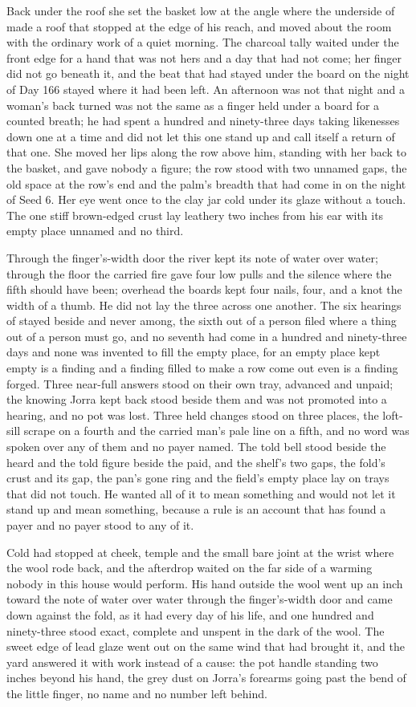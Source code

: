 Back under the roof she set the basket low at the angle where the underside of  made a roof that stopped at the edge of his reach, and moved about the room with the ordinary work of a quiet morning. The charcoal tally waited under the front edge for a hand that was not hers and a day that had not come; her finger did not go beneath it, and the beat that had stayed under the board on the night of Day 166 stayed where it had been left. An afternoon was not that night and a woman's back turned was not the same as a finger held under a board for a counted breath; he had spent a hundred and ninety-three days taking likenesses down one at a time and did not let this one stand up and call itself a return of that one. She moved her lips along the row above him, standing with her back to the basket, and gave nobody a figure; the row stood with two unnamed gaps, the old space at the row's end and the palm's breadth that had come in on the night of Seed 6. Her eye went once to the clay jar cold under its glaze without a touch. The one stiff brown-edged crust lay leathery two inches from his ear with its empty place unnamed and no third.

Through the finger's-width door the river kept its note of water over water; through the floor the carried fire gave four low pulls and the silence where the fifth should have been; overhead the boards kept four nails, four, and a knot the width of a thumb. He did not lay the three across one another. The six hearings of  stayed beside and never among, the sixth out of a person filed where a thing out of a person must go, and no seventh had come in a hundred and ninety-three days and none was invented to fill the empty place, for an empty place kept empty is a finding and a finding filled to make a row come out even is a finding forged. Three near-full answers stood on their own tray, advanced and unpaid; the knowing Jorra kept back stood beside them and was not promoted into a hearing, and no pot was lost. Three held changes stood on three places, the loft-sill scrape on a fourth and the carried man's pale line on a fifth, and no word was spoken over any of them and no payer named. The told bell stood beside the heard and the told figure beside the paid, and the shelf's two gaps, the fold's crust and its gap, the pan's gone ring and the field's empty place lay on trays that did not touch. He wanted all of it to mean something and would not let it stand up and mean something, because a rule is an account that has found a payer and no payer stood to any of it.

Cold had stopped at cheek, temple and the small bare joint at the wrist where the wool rode back, and the afterdrop waited on the far side of a warming nobody in this house would perform. His hand outside the wool went up an inch toward the note of water over water through the finger's-width door and came down against the fold, as it had every day of his life, and one hundred and ninety-three stood exact, complete and unspent in the dark of the wool. The sweet edge of lead glaze went out on the same wind that had brought it, and the yard answered it with work instead of a cause: the pot handle standing two inches beyond his hand, the grey dust on Jorra's forearms going past the bend of the little finger, no name and no number left behind.
